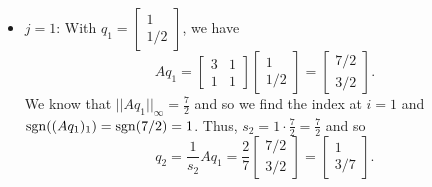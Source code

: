 \documentclass[letterpaper]{article}
\newcommand{\0}{\mathbf{0}}
\begin{document}
\begin{mdframed}
\begin{itemize}
        \item $j = 1$: With $q_1 = \begin{bmatrix}
            1 \\ 1/2
        \end{bmatrix}$, we have \[Aq_1 = \begin{bmatrix}
            3 & 1 \\ 1 & 1
        \end{bmatrix} \begin{bmatrix}
            1 \\ 1 / 2
        \end{bmatrix} = \begin{bmatrix}
            7 / 2 \\ 3 / 2
        \end{bmatrix}.\]
        We know that $||Aq_1||_\infty = \frac{7}{2}$ and so we find the index at $i = 1$ and $\operatorname{sgn}((Aq_1)_1) = \operatorname{sgn}(7 / 2) = 1$. Thus, $s_2 = 1 \cdot \frac{7}{2} = \frac{7}{2}$ and so 
        \[q_2 = \frac{1}{s_2}Aq_1 = \frac{2}{7}\begin{bmatrix}
            7/2 \\ 3/2
        \end{bmatrix} = \begin{bmatrix}
            1 \\ 3 / 7
        \end{bmatrix}.\]


\end{itemize}
\end{mdframed}
\end{document}
